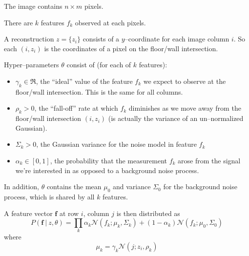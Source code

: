 \documentclass{article}
\begin{document}
\newcommand\Nrm{\mathcal{N}}

\newcommand\Ideal{\gamma}
\newcommand\FallOff{\rho}
\newcommand\NoiseVar{\Sigma}
\newcommand\Mix{\alpha}

\newcommand\Feature{f}
\newcommand\Features{\mathbf{f}}
\newcommand\Model{z}
\newcommand\Params{\theta}

\newcommand\UnderlyingF{\mu_k}

The image contains $n \times m$ pixels.

There are $k$ features $\Feature_k$ observed at each pixels.

A reconstruction $\Model=\{\Model_i\}$ consists of a $y$--coordinate
for each image column $i$. So each $(i,\Model_i)$ is the coordinates
of a pixel on the floor/wall intersection.

Hyper--parameters $\Params$ consist of (for each of $k$ features):
\begin{itemize}
  \item{$\Ideal_k\in\Re$, the ``ideal'' value of the feature $\Feature_k$ we
    expect to observe at the floor/wall intersection. This
    is the same for all columns.}
  \item{$\FallOff_k>0$, the ``fall-off'' rate at which $\Feature_k$
    diminishes as we move away from the floor/wall intersection
    $(i,z_i)$ (is actually the variance of an un--normalized
    Gaussian).}
  \item{$\NoiseVar_k > 0$, the Gaussian variance for the noise model in
    feature $\Feature_k$}
  \item{$\alpha_k \in [0,1]$, the probability that the measurement $\Feature_k$
    arose from the signal we're interested in as opposed to a
    background noise process.}
\end{itemize}

In addition, $\Params$ contains the mean $\mu_0$ and variance $\Sigma_0$ for the
background noise process, which is shared by all $k$ features.

A feature vector $\Features$ at row $i$, column $j$ is then
distributed as
\begin{equation}
  P(\Features ~|~ \Model, \Params) = \prod_k
    \Mix_k \Nrm(\Feature_k; \UnderlyingF, \NoiseVar_k) +
    (1-\Mix_k) \Nrm(\Feature_k; \mu_0, \Sigma_0)
\end{equation}
where
\begin{equation}
  \UnderlyingF = \Ideal_k \Nrm(j; \Model_i, \rho_k)
\end{equation}
\end{document}
